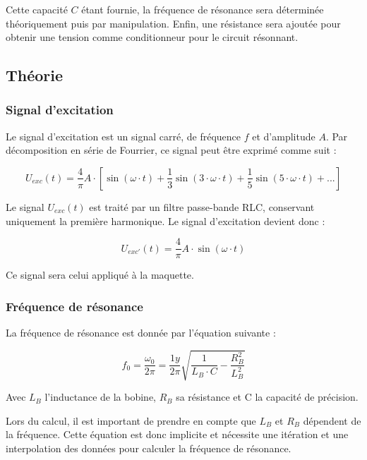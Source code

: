 Cette capacité $C$ étant fournie, la fréquence de résonance sera déterminée théoriquement puis par
manipulation. Enfin, une résistance sera ajoutée pour obtenir une tension comme conditionneur pour le 
circuit résonnant. 



\subsection{Théorie}
\subsubsection{Signal d'excitation}
Le signal d'excitation est un signal carré, de fréquence $f$ et d'amplitude $A$. Par décomposition
en série de Fourrier, ce signal peut être exprimé comme suit :

\begin{equation*}
U_{exc}(t) = \frac{4}{\pi} A \cdot [\sin(\omega \cdot t)+\frac{1}{3}\sin(3\cdot\omega \cdot t)+\frac{1}{5}\sin(5\cdot\omega \cdot t)+...]     
\end{equation*}
\vspace{0,2cm}

Le signal $U_{exc}(t)$ est traité par un filtre passe-bande RLC, conservant uniquement la première
harmonique. Le signal d'excitation devient donc :

\begin{equation*}
    U_{exc'}(t) = \frac{4}{\pi} A \cdot \sin(\omega \cdot t)
\end{equation*}

Ce signal sera celui appliqué à la maquette.

\subsubsection{Fréquence de résonance}

La fréquence de résonance est donnée par l'équation suivante :

\begin{equation}
    f_0 = \frac{\omega_0}{2\pi} = \frac{1y}{2\pi}\sqrt{\frac{1}{L_B\cdot C}-\frac{R_B^2}{L_B^2}}
    \label{eq:freq_res}
\end{equation}

Avec $L_B$ l'inductance de la bobine, $R_B$ sa résistance et C la capacité de précision.
\vspace{0,2cm}

Lors du calcul, il est important de prendre en compte que $L_B$ et $R_B$ dépendent de la fréquence.
Cette équation est donc implicite et nécessite une itération et une interpolation des données pour
calculer la fréquence de résonance.



